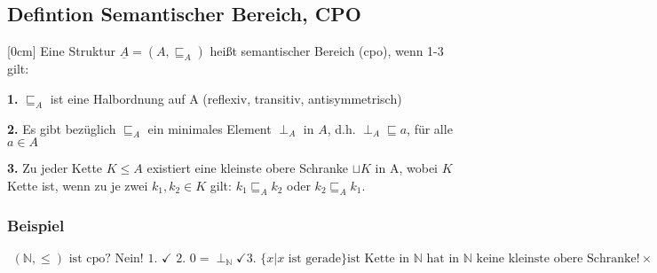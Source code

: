 \subsection{Defintion Semantischer Bereich, CPO}
[0cm]
Eine Struktur $\underline{A}=(A,\sqsubseteq_A)$ heißt semantischer Bereich (cpo), wenn 1-3 gilt:
\begin{compactitem}
	\item[\textbf{1.}] $\sqsubseteq_A$ ist eine Halbordnung auf A (reflexiv, transitiv, antisymmetrisch)
	\item[\textbf{2.}] Es gibt bezüglich $\sqsubseteq_A$ ein minimales Element $\perp_A$ in $A$, d.h. $\perp_A \sqsubseteq a$, für alle $a \in A$
	\item[\textbf{3.}] Zu jeder Kette $K \leq A$ existiert eine kleinste obere Schranke $\sqcup K$ in A, wobei $K$ Kette ist, wenn zu je zwei $k_1, k_2 \in K$ gilt: $k_1\sqsubseteq_A k_2$ oder $k_2 \sqsubseteq_A k_1$.
\subsubsection*{Beispiel}
\begin{align*}
(\mathbb{N}, \leq)\text{ ist cpo? Nein! 1. } \checkmark \text{ 2. } 0 = \perp_\mathbb{N}\checkmark \text{3. } \{x | x \text{ ist gerade}\} \text{ist Kette in } \mathbb{N}\text{ hat in } \mathbb{N}\text{ keine kleinste obere Schranke!} \times\\
\end{align*}

\end{compactitem}
